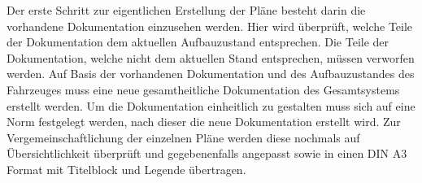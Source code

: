 Der erste Schritt zur eigentlichen Erstellung der Pläne besteht darin die vorhandene Dokumentation einzusehen werden. Hier wird überprüft, welche Teile der Dokumentation dem aktuellen Aufbauzustand entsprechen. Die Teile der Dokumentation, welche nicht dem aktuellen Stand entsprechen, müssen verworfen werden. Auf Basis der vorhandenen Dokumentation und des Aufbauzustandes des Fahrzeuges muss eine neue gesamtheitliche Dokumentation des Gesamtsystems erstellt werden. Um die Dokumentation einheitlich zu gestalten muss sich auf eine Norm festgelegt werden, nach dieser die neue Dokumentation erstellt wird.\newline
Zur Vergemeinschaftlichung der einzelnen Pläne werden diese nochmals auf Übersichtlichkeit überprüft und gegebenenfalls angepasst sowie in einen DIN A3 Format mit Titelblock und Legende übertragen.








	
